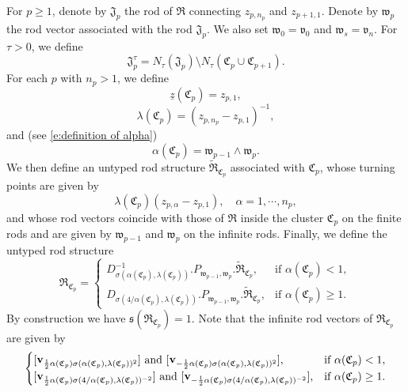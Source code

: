 \documentclass[a4paper,11pt]{amsart}
\theoremstyle{definition}
\numberwithin{equation}{section}
\newcommand{\mw} {\mathfrak w}
\newcommand{\ms} {\mathfrak s}
\newcommand{\mR} {\mathfrak R}
\newcommand{\mC} {\mathfrak C}
\DeclareMathOperator{\bv}{{\bf v}}
\begin{document}
For \( p \geq 1 \), denote by \( \mathfrak{J}_p \) the rod of \( \mathfrak{R} \) connecting \( z_{p, n_p} \) and \( z_{p+1,1} \). Denote by \( \mathfrak{w}_p \) the rod vector associated with the rod \( \mathfrak{J}_p \). We also set \( \mathfrak{w}_0 = \mathfrak{v}_0 \) and \( \mathfrak{w}_s = \mathfrak{v}_n \).  
For \( \tau > 0 \), we define  
\[
\mathfrak{J}_p^\tau = N_{\tau}(\mathfrak{J}_p) \setminus N_{\tau}(\mathfrak{C}_p \cup \mathfrak{C}_{p+1}).
\]  
For each \( p \) with \( n_p > 1 \), we define 
\[
\underline{z}(\mC_p)=z_{p, 1},
\] 
\[
\lambda(\mathfrak{C}_p) = (z_{p, n_p} - z_{p, 1})^{-1},
\]  
and (see \eqref{e:definition of alpha}) \[
\alpha(\mathfrak{C}_p) = \mathfrak{w}_{p-1}\wedge \mathfrak{w}_{p}.
\]
We then define an untyped rod structure \( \widetilde{\mathfrak{R}}_{\mathfrak{C}_p} \) associated with \( \mathfrak{C}_p \), 
whose turning points are given by  
\[
\lambda(\mathfrak{C}_p) (z_{p, \alpha} - z_{p, 1}), \quad
\alpha=1, \cdots, n_p,
\]  
and whose rod vectors coincide with those of \( \mathfrak{R} \) inside the cluster $\mC_p$ on the finite rods and are given by \( \mathfrak{w}_{p-1} \) and \( \mathfrak{w}_{p} \) on the infinite rods. Finally, we define the untyped rod structure
\begin{equation}\label{eq:def R mC_p}
    \mR_{\mC_p}=\begin{cases}
        D_{\sigma(\alpha(\mC_{p}),\lambda(\mC_{p}))}^{-1}. P_{\mathfrak{w}_{p-1},\mathfrak{w}_{p}}. \widetilde{\mR}_{\mC_p}, & \text{if }\alpha(\mC_p)<1,\\
        D_{\sigma(4/\alpha(\mC_p),\lambda(\mC_p))}.P_{\mw_{p-1},\mw_{p}}.\widetilde{\mR}_{\mC_{p}}, & \text{if }\alpha(\mC_p)\geq1.
    \end{cases} 
\end{equation}
By construction we have $\ms(\mR_{\mC_p})=1$. Note that the infinite rod vectors of $\mR_{\mC_p}$ are given by 
\begin{equation} \label{e: rod vectors two cases}
    \begin{cases}
        [\bv_{\frac{1}{2}\alpha(\mC_p)\sigma(\alpha(\mC_{p}),\lambda(\mC_{p}))^2}]\text{ and }[\bv_{-\frac{1}{2}\alpha(\mC_p)\sigma(\alpha(\mC_{p}),\lambda(\mC_{p}))^2}],&\text{if }\alpha(\mC_p)<1,\\
        [\bv_{\frac{1}{2}\alpha(\mC_p)\sigma(4/\alpha(\mC_{p}),\lambda(\mC_{p}))^{-2}}]\text{ and }[\bv_{-\frac{1}{2}\alpha(\mC_p)\sigma(4/\alpha(\mC_{p}),\lambda(\mC_{p}))^{-2}}], &\text{if }\alpha(\mC_p)\geq1.
    \end{cases}     
\end{equation}
\end{document}

